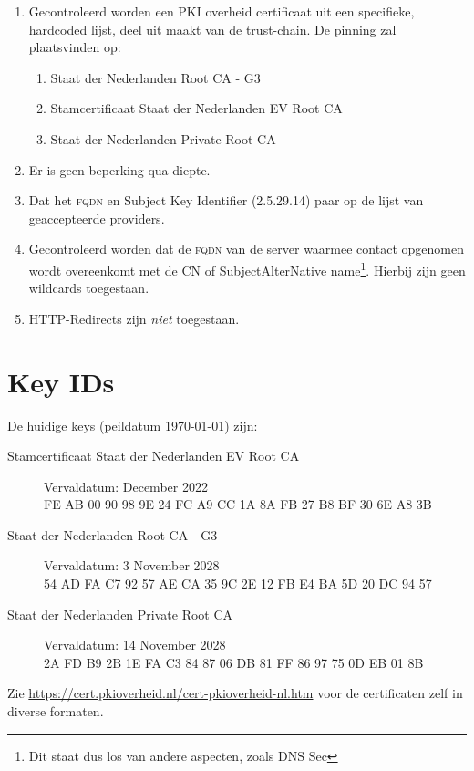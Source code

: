 \documentclass[11.0pt,twoside,openright]{report}
\begin{document}
\begin{enumerate}
\item	Gecontroleerd worden een PKI overheid certificaat uit een specifieke, hardcoded lijst, deel uit maakt van de trust-chain.
De pinning zal plaatsvinden op:
\begin{enumerate}
\item Staat der Nederlanden Root CA - G3
\item Stamcertificaat Staat der Nederlanden EV Root CA 
\item Staat der Nederlanden Private Root CA 
\end{enumerate}
\item Er is geen beperking qua diepte.

\item   Dat het \textsc{fqdn} en Subject Key Identifier (2.5.29.14) paar op de lijst van geaccepteerde providers.
\item 	Gecontroleerd worden dat de \textsc{fqdn} van de server waarmee contact opgenomen wordt overeenkomt met de CN of SubjectAlterNative name\footnote{Dit staat dus los van andere aspecten, zoals DNS Sec}. Hierbij zijn geen wildcards toegestaan. 
\item HTTP-Redirects zijn \emph{niet} toegestaan.
\end{enumerate}

\appendix
\chapter{Key IDs}
\label{keyid}

De huidige keys (peildatum \today) zijn:\\

\begin{description}
\item[Stamcertificaat Staat der Nederlanden EV Root CA]  Vervaldatum: December 2022 \\

FE AB 00 90 98 9E 24 FC A9 CC 1A 8A FB 27 B8 BF 30 6E A8 3B \\

\item[Staat der Nederlanden Root CA - G3] Vervaldatum: 3 November 2028 \\

54 AD FA C7 92 57 AE CA 35 9C 2E 12 FB E4 BA 5D 20 DC 94 57 \\

\item[Staat der Nederlanden Private Root CA] Vervaldatum: 14 November 2028  \\

2A FD B9 2B 1E FA C3 84 87 06 DB 81 FF 86 97 75 0D EB 01 8B \\
\end{description}

Zie \url{https://cert.pkioverheid.nl/cert-pkioverheid-nl.htm} voor de certificaten zelf in diverse formaten.
\end{document}
